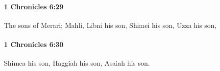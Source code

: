 		\paragraph{1 Chronicles 6:29} %
			\label{1CHRONICLES-6-29}

			The sons of Merari; Mahli, Libni his son, Shimei his son, Uzza his son,


		\paragraph{1 Chronicles 6:30} %
			\label{1CHRONICLES-6-30}

			Shimea his son, Haggiah his son, Asaiah his son.


